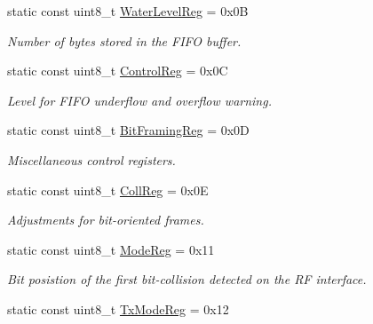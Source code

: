 \begin{DoxyCompactItemize}
static const uint8\+\_\+t \hyperlink{classMFRC522_ad7b977a0fecf852e1a564a0339b470b4}{Water\+Level\+Reg} = 0x0B
\begin{DoxyCompactList}\small\item\em Number of bytes stored in the F\+I\+FO buffer. \end{DoxyCompactList}\item 
\mbox{\label{classMFRC522_a18ecd5d31d1892b81c7fba4d86cfe509}} 
static const uint8\+\_\+t \hyperlink{classMFRC522_a18ecd5d31d1892b81c7fba4d86cfe509}{Control\+Reg} = 0x0C
\begin{DoxyCompactList}\small\item\em Level for F\+I\+FO underflow and overflow warning. \end{DoxyCompactList}\item 
\mbox{\label{classMFRC522_ae03b342f943f3cba80fd98c9db921b1b}} 
static const uint8\+\_\+t \hyperlink{classMFRC522_ae03b342f943f3cba80fd98c9db921b1b}{Bit\+Framing\+Reg} = 0x0D
\begin{DoxyCompactList}\small\item\em Miscellaneous control registers. \end{DoxyCompactList}\item 
\mbox{\label{classMFRC522_a6bbad73e1fd964473610adf1f3eb8a77}} 
static const uint8\+\_\+t \hyperlink{classMFRC522_a6bbad73e1fd964473610adf1f3eb8a77}{Coll\+Reg} = 0x0E
\begin{DoxyCompactList}\small\item\em Adjustments for bit-\/oriented frames. \end{DoxyCompactList}\item 
\mbox{\label{classMFRC522_a0509425924d23eb15b82fe70409e1afd}} 
static const uint8\+\_\+t \hyperlink{classMFRC522_a0509425924d23eb15b82fe70409e1afd}{Mode\+Reg} = 0x11
\begin{DoxyCompactList}\small\item\em Bit posistion of the first bit-\/collision detected on the RF interface. \end{DoxyCompactList}\item 
\mbox{\label{classMFRC522_a5f1ad3684cab8e35cb55c0ee88b1169e}} 
static const uint8\+\_\+t \hyperlink{classMFRC522_a5f1ad3684cab8e35cb55c0ee88b1169e}{Tx\+Mode\+Reg} = 0x12

\end{DoxyCompactItemize}
